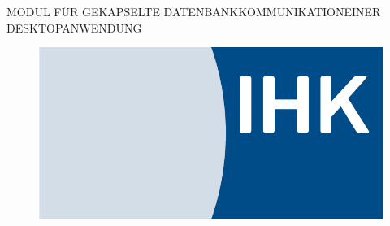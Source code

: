 \documentclass[11pt,toc=sectionentrywithoutdots, 
headheight=44pt, headings=optiontoheadandtoc, hyperfootnotes=false, hypertexnames=false]{scrartcl}
\newcommand\sectionRefs{%
	\sectiontitle  
}
\begin{document}
\setlength{\parindent}{0em} %
\setlength{\parskip}{0em} %

\thispagestyle{empty}

\cfoot[]{}
\ofoot{\thepage}



\ihead
{%
	\begin{small}
	
	
		MODUL FÜR GEKAPSELTE DATENBANKKOMMUNIKATION\newline EINER DESKTOPANWENDUNG%
		\newline\
		\textit\sectionRefs
	\end{small}%
}
\begin{figure}[h]
\includegraphics[scale=0.25]{ihkLogo}
\centering
\end{figure}
\end{document}
